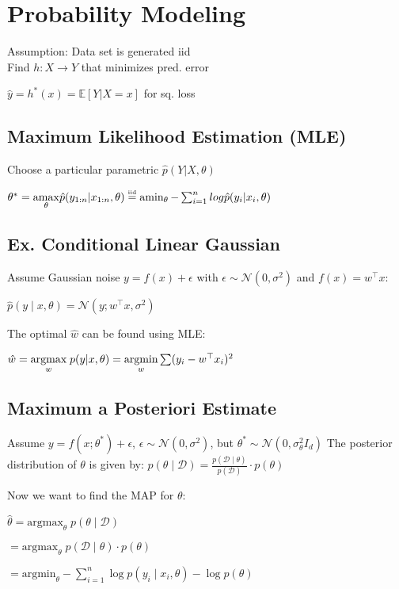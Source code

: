 \section*{Probability Modeling}
Assumption: Data set is generated iid\\
Find $h:X\rightarrow Y$ that minimizes pred. error 

$\hat{y} =h^*(x) = \mathbb{E}[Y|X=x]$ for sq. loss

\subsection*{Maximum Likelihood Estimation (MLE)}
Choose a particular parametric $\hat{p}(Y|X,\theta)$

\(\theta^* = \underset{\theta}{\operatorname{amax}} \hat{p}(y_{1:n}|x_{1:n},\theta)\\\iid 
    \operatorname{amin_\theta} - \sum_{i=1}^n log \hat{p}(y_i|x_i,\theta)\)

\subsection*{Ex. Conditional Linear Gaussian}

Assume Gaussian noise $y = f(x) + \epsilon$ with $\epsilon \sim \mathcal{N}(0, \sigma^2)$ and $f(x) = w^\top x$:

\qquad \qquad $\hat p(y \; | \; x, \theta) = \mathcal{N}(y; w^\top x, \sigma^2)$

The optimal $\hat w$ can be found using MLE:

$\hat w = \underset{w}{\text{argmax}} \; p(y | x, \theta) =\underset{w}{\text{argmin}} \sum (y_i - w^\top x_i)^2$
\subsection*{Maximum a Posteriori Estimate}

Assume $y = f(x; \theta^*) + \epsilon$, $\epsilon \sim \mathcal{N}(0, \sigma^2)$, but $\theta^* \sim \mathcal{N}(0, \sigma_\theta^2 I_d)$ The posterior distribution of $\theta$ is given by:
$p(\theta \; | \; \mathcal{D}) = \frac{p( \mathcal{D} \; | \; \theta)}{p( \mathcal{D})} \cdot p(\theta)$

Now we want to find the MAP for $\theta$:

$\hat \theta = \text{argmax}_\theta \; p(\theta \; | \; \mathcal{D})$

\quad $= \text{argmax}_\theta \; p(\mathcal{D} \; | \; \theta) \cdot p(\theta)$

\quad $= \text{argmin}_\theta - \sum_{i=1}^n \log p(y_i \; | \; x_i, \theta) - \log p(\theta)$

